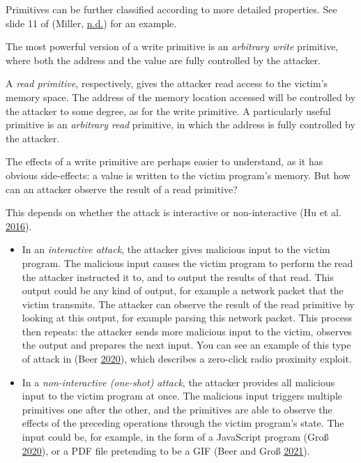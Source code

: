 \documentclass[a4paper,]{report}
\providecommand{\tightlist}{%
  \setlength{\itemsep}{0pt}\setlength{\parskip}{0pt}}
\begin{document}
Primitives can be further classified according to more detailed
properties. See slide 11 of (Miller,
\protect\hyperlink{ref-Miller2012}{n.d.}) for an example.

The most powerful version of a write primitive is an \emph{arbitrary
write} primitive, where both the address and the value are fully
controlled by the attacker.

A \emph{read primitive}, respectively, gives the
attacker read access to the victim's memory space. The address of the
memory location accessed will be controlled by the attacker to some
degree, as for the write primitive. A particularly useful primitive is
an \emph{arbitrary read} primitive, in which the address is fully
controlled by the attacker.

The effects of a write primitive are perhaps easier to understand, as it
has obvious side-effects: a value is written to the victim program's
memory. But how can an attacker observe the result of a read primitive?

This depends on whether the attack is interactive or non-interactive (Hu
et al. \protect\hyperlink{ref-Hu2016}{2016}).

\begin{itemize}
\tightlist
\item
  In an \emph{interactive attack}, the
  attacker gives malicious input to the victim program. The malicious
  input causes the victim program to perform the read the attacker
  instructed it to, and to output the results of that read. This output
  could be any kind of output, for example a network packet that the
  victim transmits. The attacker can observe the result of the read
  primitive by looking at this output, for example parsing this network
  packet. This process then repeats: the attacker sends more malicious
  input to the victim, observes the output and prepares the next input.
  You can see an example of this type of attack in (Beer
  \protect\hyperlink{ref-Beer2020}{2020}), which describes a zero-click
  radio proximity exploit.
\item
  In a \emph{non-interactive (one-shot)
  attack}, the attacker provides all malicious input to the victim
  program at once. The malicious input triggers multiple primitives one
  after the other, and the primitives are able to observe the effects of
  the preceding operations through the victim program's state. The input
  could be, for example, in the form of a JavaScript program (Groß
  \protect\hyperlink{ref-Grouxdf2020}{2020}), or a PDF file pretending
  to be a GIF (Beer and Groß \protect\hyperlink{ref-Beer2021}{2021}).
\end{itemize}
\end{document}
